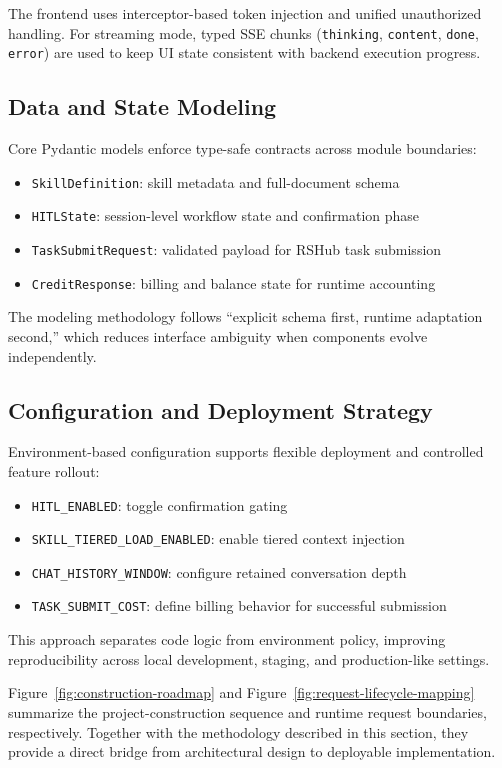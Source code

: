 The frontend uses interceptor-based token injection and unified unauthorized handling. For streaming mode, typed SSE chunks (\texttt{thinking}, \texttt{content}, \texttt{done}, \texttt{error}) are used to keep UI state consistent with backend execution progress.

\subsection{Data and State Modeling}
Core Pydantic models enforce type-safe contracts across module boundaries:
\begin{itemize}
	\item \texttt{SkillDefinition}: skill metadata and full-document schema
	\item \texttt{HITLState}: session-level workflow state and confirmation phase
	\item \texttt{TaskSubmitRequest}: validated payload for RSHub task submission
	\item \texttt{CreditResponse}: billing and balance state for runtime accounting
\end{itemize}

The modeling methodology follows ``explicit schema first, runtime adaptation second,'' which reduces interface ambiguity when components evolve independently.

\subsection{Configuration and Deployment Strategy}
Environment-based configuration supports flexible deployment and controlled feature rollout:
\begin{itemize}
	\item \texttt{HITL\_ENABLED}: toggle confirmation gating
	\item \texttt{SKILL\_TIERED\_LOAD\_ENABLED}: enable tiered context injection
	\item \texttt{CHAT\_HISTORY\_WINDOW}: configure retained conversation depth
	\item \texttt{TASK\_SUBMIT\_COST}: define billing behavior for successful submission
\end{itemize}

This approach separates code logic from environment policy, improving reproducibility across local development, staging, and production-like settings.

Figure~\ref{fig:construction-roadmap} and Figure~\ref{fig:request-lifecycle-mapping} summarize the project-construction sequence and runtime request boundaries, respectively. Together with the methodology described in this section, they provide a direct bridge from architectural design to deployable implementation.

